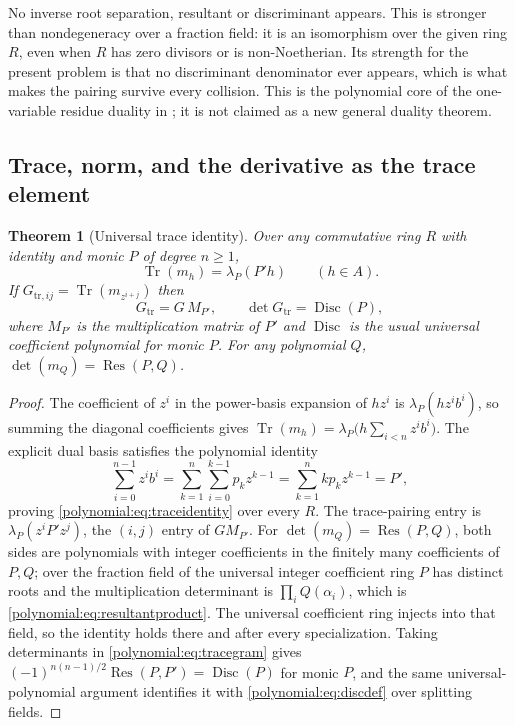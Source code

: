 \documentclass[11pt,letterpaper]{article}
\numberwithin{equation}{section}
\newtheorem{theorem}{Theorem}[section]
\theoremstyle{definition}
\theoremstyle{remark}\newtheorem{remark}[theorem]{Remark}
\newcommand{\Res}{\operatorname{Res}}
\newcommand{\Disc}{\operatorname{Disc}}
\newcommand{\Tr}{\operatorname{Tr}}
\begin{document}
No inverse root separation, resultant or discriminant appears. This is
stronger than nondegeneracy over a fraction field: it is an isomorphism over
the given ring $R$, even when $R$ has zero divisors or is non-Noetherian. Its
strength for the present problem is that no discriminant denominator ever
appears, which is what makes the pairing survive every collision. This is the
polynomial core of the one-variable residue duality in
\cite{polynomial:SourceResearch}; it is not claimed as a new general duality
theorem.

\subsection{Trace, norm, and the derivative as the trace element}
\begin{theorem}[Universal trace identity]\label{polynomial:thm:trace}
Over any commutative ring $R$ with identity and monic $P$ of degree $n\ge1$,
\begin{equation}\label{polynomial:eq:traceidentity}
 \Tr(m_h)=\lambda_P(P'h)\qquad(h\in A).
\end{equation}
If $G_{\mathrm{tr},ij}=\Tr(m_{z^{i+j}})$ then
\begin{equation}\label{polynomial:eq:tracegram}
 G_{\mathrm{tr}}=G\,M_{P'},\qquad \det G_{\mathrm{tr}}=\Disc(P),
\end{equation}
where $M_{P'}$ is the multiplication matrix of $P'$ and $\Disc$ is the usual
universal coefficient polynomial for monic $P$. For any polynomial $Q$,
$\det(m_Q)=\Res(P,Q)$.
\end{theorem}
\begin{proof}
The coefficient of $z^i$ in the power-basis expansion of $hz^i$ is
$\lambda_P(hz^ib^i)$, so summing the diagonal coefficients gives
$\Tr(m_h)=\lambda_P\bigl(h\sum_{i<n}z^ib^i\bigr)$. The explicit dual basis
satisfies the polynomial identity
\begin{equation}\label{polynomial:eq:eulerderivative}
 \sum_{i=0}^{n-1}z^ib^i=\sum_{k=1}^n\sum_{i=0}^{k-1}p_kz^{k-1}
 =\sum_{k=1}^nkp_kz^{k-1}=P' ,
\end{equation}
proving \eqref{polynomial:eq:traceidentity} over every $R$. The
trace-pairing entry is $\lambda_P(z^iP'z^j)$, the $(i,j)$ entry of $GM_{P'}$.
For $\det(m_Q)=\Res(P,Q)$, both sides are polynomials with integer
coefficients in the finitely many coefficients of $P,Q$; over the fraction
field of the universal integer coefficient ring $P$ has distinct roots and the
multiplication determinant is $\prod_iQ(\alpha_i)$, which is
\eqref{polynomial:eq:resultantproduct}. The universal coefficient ring injects
into that field, so the identity holds there and after every specialization.
Taking determinants in \eqref{polynomial:eq:tracegram} gives
$(-1)^{n(n-1)/2}\Res(P,P')=\Disc(P)$ for monic $P$, and the same
universal-polynomial argument identifies it with
\eqref{polynomial:eq:discdef} over splitting fields.
\end{proof}
\end{document}
